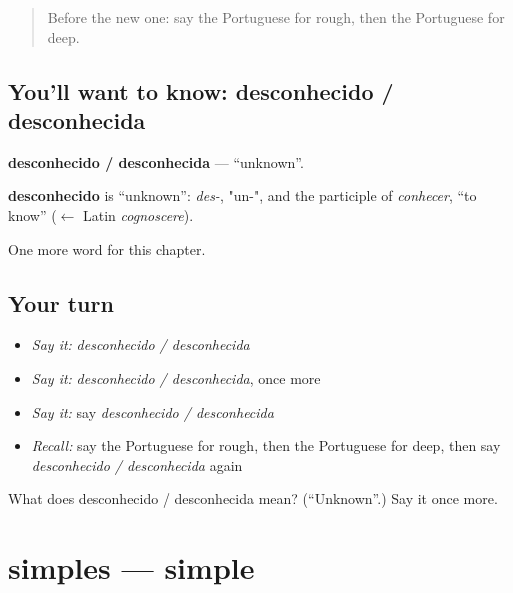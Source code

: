 \label{lesson:PT-C241-desconhecido-desconhecida}



\begin{quote}
Before the new one: say the Portuguese for rough, then the Portuguese for deep.
\end{quote}

\subsection*{You'll want to know: desconhecido / desconhecida}
\textbf{desconhecido / desconhecida} — \textquotedblleft{}unknown\textquotedblright{}.

\begin{cousinweb}
\textbf{desconhecido} is \textquotedblleft{}unknown\textquotedblright{}: \emph{des-}, "un-", and the participle of \emph{conhecer}, \textquotedblleft{}to know\textquotedblright{} ($\leftarrow$ Latin \emph{cognoscere}).
\end{cousinweb}

\begin{grammarlens}[title={What you've built}]
One more word for this chapter.
\end{grammarlens}

\subsection*{Your turn}
\begin{itemize}
\raggedright
  \item \emph{Say it:} \emph{desconhecido / desconhecida}
  \item \emph{Say it:} \emph{desconhecido / desconhecida}, once more
  \item \emph{Say it:} say \emph{desconhecido / desconhecida}
  \item \emph{Recall:} say the Portuguese for rough, then the Portuguese for deep, then say \emph{desconhecido / desconhecida} again
\end{itemize}

\begin{tcolorbox}[breakable,colback=teal!4,colframe=teal!35!black,title={Before you move on}]
What does desconhecido / desconhecida mean? (\textquotedblleft{}Unknown\textquotedblright{}.) Say it once more.
\end{tcolorbox}
\section[simples]{simples — simple}

